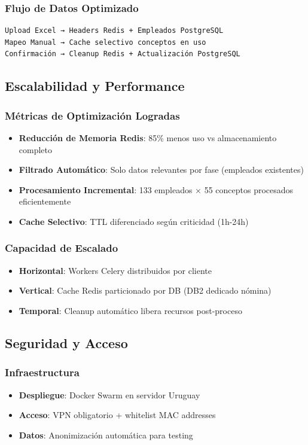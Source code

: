 \subsubsection{Flujo de Datos Optimizado}
\begin{verbatim}
Upload Excel → Headers Redis + Empleados PostgreSQL
Mapeo Manual → Cache selectivo conceptos en uso
Confirmación → Cleanup Redis + Actualización PostgreSQL
\end{verbatim}

\subsection{Escalabilidad y Performance}

\subsubsection{Métricas de Optimización Logradas}
\begin{itemize}
    \item \textbf{Reducción de Memoria Redis}: 85\% menos uso vs almacenamiento completo
    \item \textbf{Filtrado Automático}: Solo datos relevantes por fase (empleados existentes)
    \item \textbf{Procesamiento Incremental}: 133 empleados × 55 conceptos procesados eficientemente
    \item \textbf{Cache Selectivo}: TTL diferenciado según criticidad (1h-24h)
\end{itemize}

\subsubsection{Capacidad de Escalado}
\begin{itemize}
    \item \textbf{Horizontal}: Workers Celery distribuidos por cliente
    \item \textbf{Vertical}: Cache Redis particionado por DB (DB2 dedicado nómina)
    \item \textbf{Temporal}: Cleanup automático libera recursos post-proceso
\end{itemize}

\subsection{Seguridad y Acceso}

\subsubsection{Infraestructura}
\begin{itemize}
    \item \textbf{Despliegue}: Docker Swarm en servidor Uruguay
    \item \textbf{Acceso}: VPN obligatorio + whitelist MAC addresses
    \item \textbf{Datos}: Anonimización automática para testing
\end{itemize}

